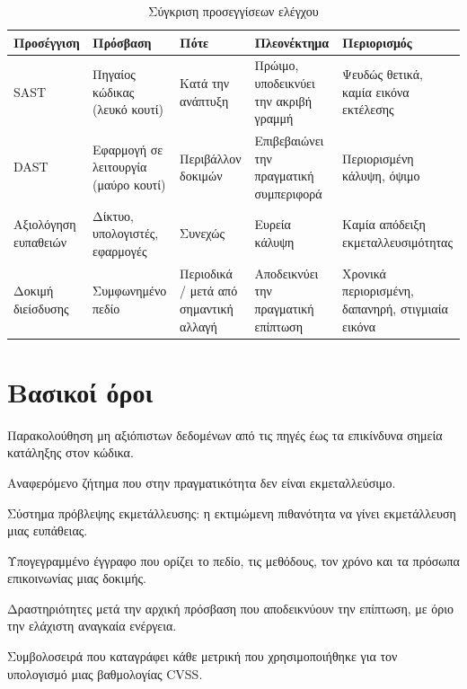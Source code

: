 \begin{table}[htbp]
  \centering\small
  \caption{Σύγκριση προσεγγίσεων ελέγχου}
  \begin{tabularx}{\linewidth}{>{\raggedright\arraybackslash}X >{\raggedright\arraybackslash}X >{\raggedright\arraybackslash}X >{\raggedright\arraybackslash}X >{\raggedright\arraybackslash}X}
    \toprule
    \textbf{Προσέγγιση} & \textbf{Πρόσβαση} & \textbf{Πότε} & \textbf{Πλεονέκτημα} & \textbf{Περιορισμός} \\
    \midrule
    SAST & Πηγαίος κώδικας (λευκό κουτί) & Κατά την ανάπτυξη & Πρώιμο, υποδεικνύει την ακριβή γραμμή & Ψευδώς θετικά, καμία εικόνα εκτέλεσης \\
    DAST & Εφαρμογή σε λειτουργία (μαύρο κουτί) & Περιβάλλον δοκιμών & Επιβεβαιώνει την πραγματική συμπεριφορά & Περιορισμένη κάλυψη, όψιμο \\
    Αξιολόγηση ευπαθειών & Δίκτυο, υπολογιστές, εφαρμογές & Συνεχώς & Ευρεία κάλυψη & Καμία απόδειξη εκμεταλλευσιμότητας \\
    Δοκιμή διείσδυσης & Συμφωνημένο πεδίο & Περιοδικά / μετά από σημαντική αλλαγή & Αποδεικνύει την πραγματική επίπτωση & Χρονικά περιορισμένη, δαπανηρή, στιγμιαία εικόνα \\
    \bottomrule
  \end{tabularx}
\end{table}
\section*{Βασικοί όροι}
\begin{description}[style=nextline,leftmargin=1.2em]
  \item[Ανάλυση μόλυνσης] Παρακολούθηση μη αξιόπιστων δεδομένων από τις πηγές έως τα επικίνδυνα σημεία κατάληξης στον κώδικα.
  \item[Ψευδώς θετικό] Αναφερόμενο ζήτημα που στην πραγματικότητα δεν είναι εκμεταλλεύσιμο.
  \item[EPSS] Σύστημα πρόβλεψης εκμετάλλευσης: η εκτιμώμενη πιθανότητα να γίνει εκμετάλλευση μιας ευπάθειας.
  \item[Κανόνες εμπλοκής] Υπογεγραμμένο έγγραφο που ορίζει το πεδίο, τις μεθόδους, τον χρόνο και τα πρόσωπα επικοινωνίας μιας δοκιμής.
  \item[Μετά την εκμετάλλευση] Δραστηριότητες μετά την αρχική πρόσβαση που αποδεικνύουν την επίπτωση, με όριο την ελάχιστη αναγκαία ενέργεια.
  \item[Διάνυσμα CVSS] Συμβολοσειρά που καταγράφει κάθε μετρική που χρησιμοποιήθηκε για τον υπολογισμό μιας βαθμολογίας CVSS.
\end{description}

